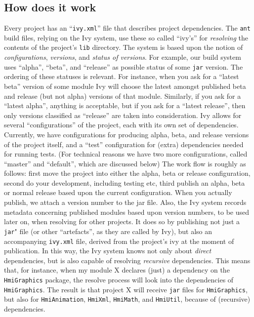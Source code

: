 \subsection{How does it work}
Every project has an ``\verb"ivy.xml"'' file that describes project dependencies.
The \verb"ant" build files, relying on the Ivy system, use these so called ``ivy's'' for
\emph{resolving} the contents of the project's \verb"lib" directory.
The system is based upon the notion of \emph{configurations}, \emph{versions}, and \emph{status of versions}.
For example, our build system uses ``alpha'', ``beta'', and ``release'' as possible status of some
\verb"jar" version. The ordering of these statuses is relevant. For instance, when you ask for a ``latest beta'' version
of some module Ivy will choose the latest amongst published beta and release (but not alpha) versions of that module.
Similarly, if you ask for a ``latest alpha'', anything is acceptable, but if you ask for a ``latest release'', then
only versions classified as ``release'' are taken into consideration.
Ivy allows for several ``configurations'' of the project, each with its own set of dependencies.
Currently, we have configurations for producing alpha, beta,  and release versions of the project itself, and
a ``test'' configuration for (extra) dependencies needed for running tests.
(For technical reasons we have two more configurations, called ``master'' and ``default'', which are discussed below)
The work flow is roughly as follows: first move the project into either the alpha, beta or release configuration,
second do your development, including testing etc, third publish an alpha, beta or normal release based upon the current
configuration. When you actually publish, we attach a version number to the jar file. Also,
the Ivy system records metadata concerning published modules based upon version numbers, to be used later on,
when resolving for other projects. It does so by publishing not just a \verb"jar"" file (or other ``artefacts'', as they are called by Ivy), but also an accompanying \verb"ivy.xml" file, derived from the project's ivy at the moment of publication.
In this way, the Ivy system knows not only about \emph{direct} dependencies, but is also capable
of resolving \emph{recursive} dependencies. This means that, for instance, when my module X declares (just) a dependency
on the \verb"HmiGraphics" package, the resolve process will look into the dependencies of \verb"HmiGraphics".
The result is that project X will receive \verb"jar" files for \verb"HmiGraphics", but also
for \verb"HmiAnimation", \verb"HmiXml", \verb"HmiMath", and \verb"HmiUtil", because of (recursive) dependencies.
